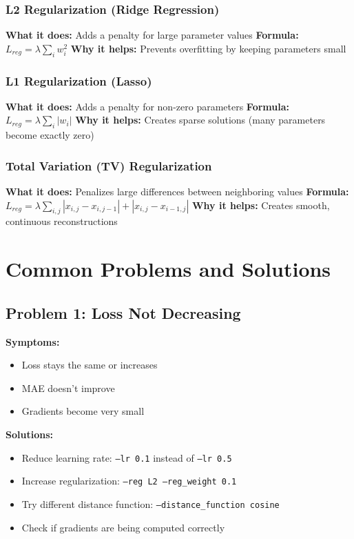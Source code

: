\documentclass[12pt]{article}
\begin{document}
\subsubsection{L2 Regularization (Ridge Regression)}
\textbf{What it does:} Adds a penalty for large parameter values
\textbf{Formula:} $L_{reg} = \lambda \sum_{i} w_i^2$
\textbf{Why it helps:} Prevents overfitting by keeping parameters small

\subsubsection{L1 Regularization (Lasso)}
\textbf{What it does:} Adds a penalty for non-zero parameters
\textbf{Formula:} $L_{reg} = \lambda \sum_{i} |w_i|$
\textbf{Why it helps:} Creates sparse solutions (many parameters become exactly zero)

\subsubsection{Total Variation (TV) Regularization}
\textbf{What it does:} Penalizes large differences between neighboring values
\textbf{Formula:} $L_{reg} = \lambda \sum_{i,j} |x_{i,j} - x_{i,j-1}| + |x_{i,j} - x_{i-1,j}|$
\textbf{Why it helps:} Creates smooth, continuous reconstructions

\section{Common Problems and Solutions}

\subsection{Problem 1: Loss Not Decreasing}

\textbf{Symptoms:}
\begin{itemize}
    \item Loss stays the same or increases
    \item MAE doesn't improve
    \item Gradients become very small
\end{itemize}

\textbf{Solutions:}
\begin{itemize}
    \item Reduce learning rate: \texttt{--lr 0.1} instead of \texttt{--lr 0.5}
    \item Increase regularization: \texttt{--reg L2 --reg\_weight 0.1}
    \item Try different distance function: \texttt{--distance\_function cosine}
    \item Check if gradients are being computed correctly
\end{itemize}
\end{document}
